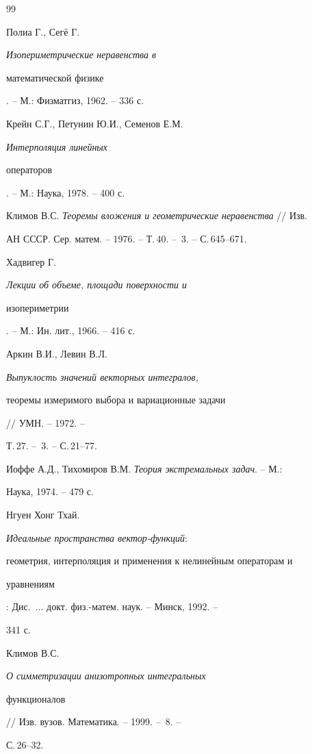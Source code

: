 \begin{thebibliography}{99} 


 




Полиа Г., Сег\"е Г. {\em Изопериметрические неравенства в 


математической физике}. -- М.: Физматгиз, 1962. -- 336 с. 




Крейн С.Г., Петунин Ю.И., Семенов Е.М. {\em Интерполяция линейных 


операторов}. -- М.: Наука, 1978. -- 400 с. 




Климов В.С. {\em Теоремы вложения и геометрические неравенства} // Изв. 


АН СССР. Сер. матем. -- 1976. -- Т.\,40. -- \No\,3. -- С.\,645--671. 




Хадвигер Г. {\em Лекции об объеме, площади поверхности и 


изопериметрии}. -- М.: Ин. лит., 1966. -- 416 с. 




Аркин В.И., Левин В.Л. {\em Выпуклость значений векторных интегралов, 


теоремы измеримого выбора и вариационные задачи} // УМН. -- 1972. -- 


Т.\,27. -- \No\,3. -- С.\,21--77. 




Иоффе А.Д., Тихомиров В.М. {\em Теория экстремальных задач}. -- М.: 


Наука, 1974. -- 479 с. 




Нгуен Хонг Тхай. {\em Идеальные пространства вектор-функций${:}$ 


геометрия, интерполяция и применения к нелинейным операторам и 


уравнениям}: Дис.~$\dotsc$ докт. физ.-матем. наук. -- Минск, 1992. -- 


341 с. 




Климов В.С. {\em О симметризации анизотропных интегральных 


функционалов} // Изв. вузов. Математика. -- 1999. -- \No\,8. -- 


С.\,26--32. 





\end{thebibliography}

